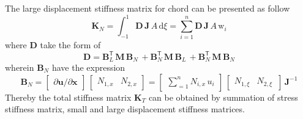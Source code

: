 The large displacement stiffness matrix for chord can be presented as follow
\begin{equation}
\mathbf{K}_{N} = \int_{-1}^{1} \mathbf{D} \, \mathbf{J}  \, A \,  \mathrm{d} \xi 
= \sum_{i=1}^{n} \mathbf{D} \, \mathbf{J} \, A \, \mathrm{w}_i
\end{equation}
where $\mathbf{D}$ take the form of
\begin{equation}
\mathbf{D} = \mathbf{B}_L^{\mathsf{T}} \, \mathbf{M} \, \mathbf{B}_N \, + \mathbf{B}_N^{\mathsf{T}} \, \mathbf{M} \, \mathbf{B}_L \, + \mathbf{B}_N^{\mathsf{T}} \, \mathbf{M} \, \mathbf{B}_N 
\end{equation}
wherein $\mathbf{B}_N$ have the expression 
\begin{equation}
\mathbf{B}_{N} =  \begin{bmatrix}
\partial \mathbf{u} / \partial \mathbf{x} 
\end{bmatrix} \, \begin{bmatrix}
 N_{1,x} &  N_{2,x}
\end{bmatrix} = \begin{bmatrix}
\sum\nolimits_{=1}^n N_{i,x} \, u_i
\end{bmatrix} \, \begin{bmatrix}
 N_{1,\xi} &   N_{2,\xi} \, 
\end{bmatrix} \, \mathbf{J}^{-1} 
\end{equation}
Thereby the total stiffness matrix $\mathbf{K}_T$ can be obtained by summation of stress stiffness matrix, small and large displacement stiffness matrices.

